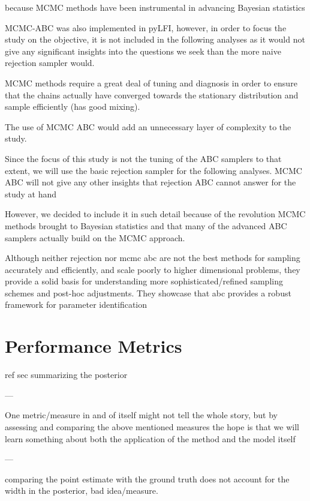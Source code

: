 because MCMC methods have been instrumental in advancing Bayesian statistics

MCMC-ABC was also implemented in pyLFI, however, in order to focus the study on the objective, it is not included in the following analyses as it would not give any significant insights into the questions we seek than the more naive rejection sampler would. 

MCMC methods require a great deal of tuning and diagnosis in order to ensure that the chains actually have converged towards the stationary distribution and sample efficiently (has good mixing).

The use of MCMC ABC would add an unnecessary layer of complexity to the study.

Since the focus of this study is not the tuning of the ABC samplers to that extent, we will use the basic rejection sampler for the following analyses. MCMC ABC will not give any other insights that rejection ABC cannot answer for the study at hand 

However, we decided to include it in such detail because of the revolution MCMC methods brought to Bayesian statistics and that many of the advanced ABC samplers actually build on the MCMC approach. 

Although neither rejection nor mcmc abc are not the best methods for sampling accurately and efficiently, and scale poorly to higher dimensional problems, they provide a solid basis for understanding more sophisticated/refined sampling schemes and post-hoc adjustments. They showcase that abc provides a robust framework for parameter identification


\section{Performance Metrics}

ref sec summarizing the posterior

---

One metric/measure in and of itself might not tell the whole story, but by assessing and comparing the above mentioned measures the hope is that we will learn something about both the application of the method and the model itself

---

comparing the point estimate with the ground truth does not account for the width in the posterior, bad idea/measure. 


